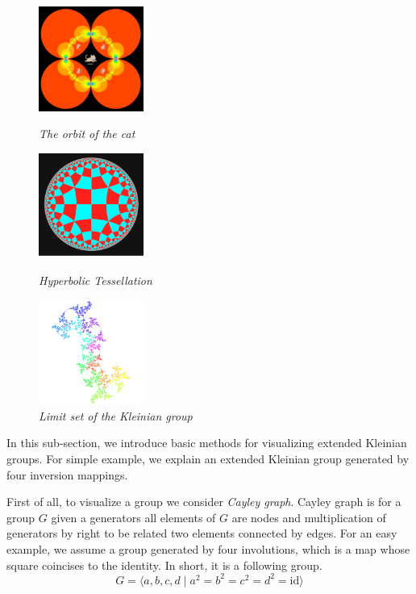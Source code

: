 \begin{figure}[htbp]
 \begin{minipage}[t]{0.3333\hsize}
  \center
  \includegraphics[height=1.35in, keepaspectratio]{img/preparation/basic/catCircleOrbit.png}
  \caption{\textit{The orbit of the cat}}
  \label{fig:orbitCat}
  \hspace*{\fill}
 \end{minipage}
 \begin{minipage}[t]{0.3333\hsize}
  \center
  \includegraphics[height=1.35in, keepaspectratio]{img/preparation/basic/hyperbolicTessellation.png}
  \caption{\textit{Hyperbolic Tessellation}}
  \label{fig:hypTiling}
  \hspace*{\fill}
 \end{minipage}
 \begin{minipage}[t]{0.3333\hsize}
  \center
  \includegraphics[height=1.35in, keepaspectratio]{img/preparation/limitSet/limit.png}
  \caption{\textit{Limit set of the Kleinian group}}
  \label{fig:limit}
  \hspace*{\fill}
 \end{minipage}
\end{figure}

\noindent In this sub-section, we introduce basic methods for
visualizing extended Kleinian groups.
For simple example, we explain an extended Kleinian group generated by
four inversion mappings.

First of all, to visualize a group we consider \textit{Cayley graph}.
Cayley graph is for a group $G$ given a generators
all elements of $G$ are nodes and multiplication of generators by
right to be related two elements connected by edges.
For an easy example, we assume a group generated by four
involutions, which is a map whose square coincises to the identity.
In short, it is a following group.
\[ G=\langle a,b,c,d \mid a^2=b^2=c^2=d^2 = \mathrm{id} \rangle \]

